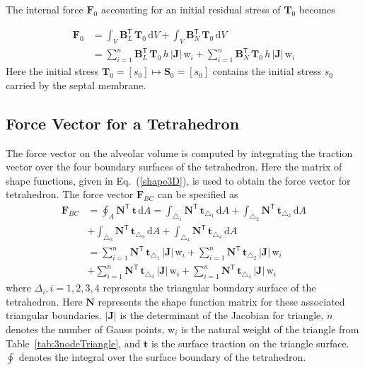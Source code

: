 The internal force $\boldsymbol{F}_0$ accounting for an initial residual stress of $\boldsymbol{T}_0$ becomes

\begin{equation}
	\begin{aligned}
		\boldsymbol{F}_0 &= \int_V \mathbf{B}_L^{\mathsf{T}} \,	\boldsymbol{T}_0 \, 
		\mathrm{d}V + 	\int_V \mathbf{B}_N^{\mathsf{T}} \,	\boldsymbol{T}_0 \, \mathrm{d}V \\
		& =  \sum_{i=1}^{n} \mathbf{B}_L^{\mathsf{T}} \,	\boldsymbol{T}_0 \, h \, | \mathbf{J} | \, \mathrm{w}_i +  \sum_{i=1}^{n} \mathbf{B}_N^{\mathsf{T}} \,	\boldsymbol{T}_0 \, h \, | \mathbf{J} | \, \mathrm{w}_i
	\end{aligned}
\end{equation}
Here the initial stress $\mathbf{T}_0 = [s_0] \mapsto \mathbf{S}_0 = [s_0]$  contains the initial stress $s_0$ carried by the septal membrane.

\subsection{Force Vector for a Tetrahedron}

The force vector on the alveolar volume is computed by integrating the traction vector over the four boundary surfaces of the tetrahedron. Here the matrix of shape functions, given in Eq.~(\ref{shape3D}), is used to obtain the force vector for tetrahedron. The force vector $\mathbf{F}_{BC}$ can be specified as
\begin{equation}
\begin{aligned}
\mathbf{F}_{BC} &= \oint_{A} \mathbf{N}^{\mathsf{T}} \, \mathbf{t} \, \mathrm{d} A = \int_{\triangle_{1}} \mathbf{N}^{\mathsf{T}} \, \mathbf{t}_{\triangle_{1}} \, \mathrm{d} A  + \int_{\triangle_{2}}  \mathbf{N}^{\mathsf{T}} \, \mathbf{t}_{\triangle_{2}}  \, \mathrm{d} A \\
& + \int_{\triangle_{3}} \mathbf{N}^{\mathsf{T}} \, \mathbf{t}_{\triangle_{3}} \, \mathrm{d} A + \int_{\triangle_{4}} \mathbf{N}^{\mathsf{T}} \, \mathbf{t}_{\triangle_{4}} \, \mathrm{d} A \\
& = \sum_{i=1}^{n} \mathbf{N}^{\mathsf{T}} \, \mathbf{t}_{\triangle_{1}} \,|\mathbf{J}| \, \mathrm{w}_i  + \sum_{i=1}^{n}  \mathbf{N}^{\mathsf{T}} \, \mathbf{t}_{\triangle_{2}} \,|\mathbf{J}| \, \mathrm{w}_i  \\
& + \sum_{i=1}^{n} \mathbf{N}^{\mathsf{T}} \, \mathbf{t}_{\triangle_{3}} \,|\mathbf{J}| \, \mathrm{w}_i  + \sum_{i=1}^{n}  \mathbf{N}^{\mathsf{T}} \, \mathbf{t}_{\triangle_{4}} \,|\mathbf{J}| \, \mathrm{w}_i 
\end{aligned}
\end{equation}
where $\Delta_i, i=1, 2, 3, 4$ represents the triangular boundary surface of the tetrahedron. Here $ \mathbf{N}$ represents the shape function matrix for these associated triangular boundaries.   $|\mathbf{J}|$ is the determinant of the Jacobian for triangle, $n$ denotes the number of Gauss points, $\mathrm{w}_i$ is the natural weight of the triangle from Table~\ref{tab:3nodeTriangle}, and $\mathbf{t}$ is the surface traction on the triangle surface. $\oint$ denotes the integral over the surface boundary of the tetrahedron.

